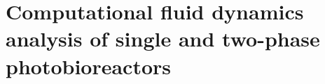 \chapter[Computational fluid dynamics analysis of single and two-phase photobioreactors]{Computational fluid dynamics analysis of single and two-phase photobioreactors}
\label{chap:chap3}	%
\pagestyle{headings}


